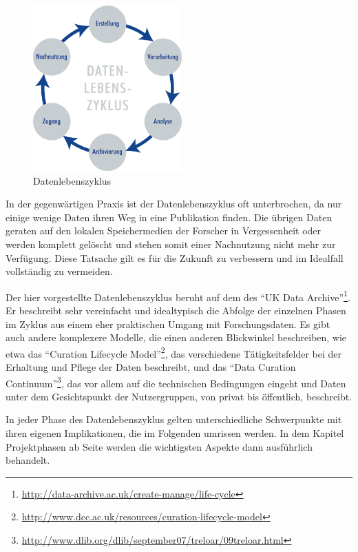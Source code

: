 \begin{figure}%
  \begin{center}
    \includegraphics[width=0.51\textwidth]{bilder/Datenlebenszyklus}
  \end{center}
  \caption{Datenlebenszyklus}
\end{figure}

In der gegenwärtigen Praxis ist der Datenlebenszyklus oft unterbrochen, da nur einige wenige Daten ihren Weg in eine Publikation finden. Die übrigen Daten geraten auf den lokalen Speichermedien der Forscher in Vergessenheit oder werden komplett gelöscht und stehen somit einer Nachnutzung nicht mehr zur Verfügung. Diese Tatsache gilt es für die Zukunft zu verbessern und im Idealfall vollständig zu vermeiden.

Der hier vorgestellte Datenlebenszyklus beruht auf dem des "`UK Data Archive"'\footnote{\url{http://data-archive.ac.uk/create-manage/life-cycle}}. Er beschreibt sehr vereinfacht und idealtypisch die Abfolge der einzelnen Phasen im Zyklus aus einem eher praktischen Umgang mit Forschungsdaten. Es gibt auch andere komplexere Modelle, die einen anderen Blickwinkel beschreiben, wie etwa das "`Curation Lifecycle Model"'\footnote{\url{http://www.dcc.ac.uk/resources/curation-lifecycle-model}}, das verschiedene Tätigkeitsfelder bei der Erhaltung und Pflege der Daten beschreibt, und das "`Data Curation Continuum"'\footnote{\url{http://www.dlib.org/dlib/september07/treloar/09treloar.html}}, das vor allem auf die technischen Bedingungen eingeht und Daten unter dem Gesichtspunkt der Nutzergruppen, von privat bis öffentlich, beschreibt.

In jeder Phase des Datenlebenszyklus gelten unterschiedliche Schwerpunkte mit ihren eigenen Implikationen, die im Folgenden umrissen werden. In dem Kapitel Projektphasen ab Seite \pageref{projektphasen} werden die wichtigsten Aspekte dann ausführlich behandelt.

